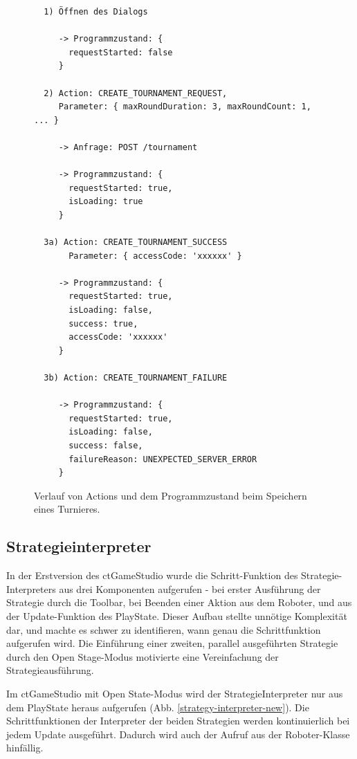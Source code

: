 \begin{figure}
  \caption{Verlauf von Actions und dem Programmzustand beim Speichern eines Turnieres.}

  \label{create-tournament-flow}

  \begin{lstlisting}
  1) Öffnen des Dialogs

     -> Programmzustand: {
       requestStarted: false
     }

  2) Action: CREATE_TOURNAMENT_REQUEST,
     Parameter: { maxRoundDuration: 3, maxRoundCount: 1, ... }

     -> Anfrage: POST /tournament

     -> Programmzustand: {
       requestStarted: true,
       isLoading: true
     }

  3a) Action: CREATE_TOURNAMENT_SUCCESS
       Parameter: { accessCode: 'xxxxxx' }

     -> Programmzustand: {
       requestStarted: true,
       isLoading: false,
       success: true,
       accessCode: 'xxxxxx'
     }

  3b) Action: CREATE_TOURNAMENT_FAILURE

     -> Programmzustand: {
       requestStarted: true,
       isLoading: false,
       success: false,
       failureReason: UNEXPECTED_SERVER_ERROR
     }
  \end{lstlisting}
\end{figure}


\subsection{Strategieinterpreter}

In der Erstversion des ctGameStudio wurde die Schritt-Funktion des Strategie-Interpreters aus drei Komponenten
aufgerufen - bei erster Ausführung der Strategie durch die Toolbar, bei Beenden einer Aktion aus dem
Roboter, und aus der Update-Funktion des PlayState. Dieser Aufbau stellte unnötige Komplexität dar,
und machte es schwer zu identifieren, wann genau die Schrittfunktion aufgerufen wird. Die Einführung
einer zweiten, parallel ausgeführten Strategie durch den Open Stage-Modus motivierte eine
Vereinfachung der Strategieausführung.

Im ctGameStudio mit Open State-Modus wird der StrategieInterpreter nur aus dem PlayState heraus
aufgerufen (Abb. \ref{strategy-interpreter-new}). Die Schrittfunktionen der Interpreter der beiden
Strategien werden kontinuierlich bei jedem Update ausgeführt. Dadurch wird auch der Aufruf aus der
Roboter-Klasse hinfällig.

